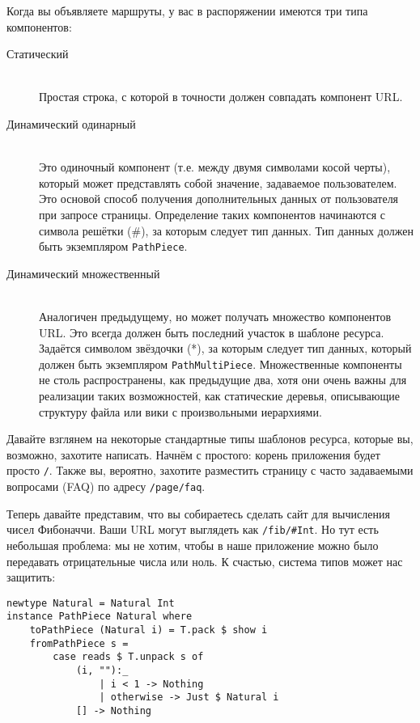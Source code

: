 Когда вы объявляете маршруты, у вас в распоряжении имеются три типа компонентов:
\begin{description}
\item[Статический] \hfill \\
  Простая строка, с которой в точности должен совпадать компонент URL.

\item[Динамический одинарный] \hfill \\
  Это одиночный компонент (т.е. между двумя символами косой черты), который может
  представлять собой значение, задаваемое пользователем. Это основой способ получения
  дополнительных данных от пользователя при запросе страницы. Определение таких
  компонентов начинаются с символа решётки (\#), за которым следует тип данных. Тип данных
  должен быть экземпляром \lstinline!PathPiece!.

\item[Динамический множественный] \hfill \\
  Аналогичен предыдущему, но может получать множество компонентов URL. Это всегда должен
  быть последний участок в шаблоне ресурса. Задаётся символом звёздочки (*), за которым
  следует тип данных, который должен быть экземпляром
  \lstinline!PathMultiPiece!. Множественные компоненты не столь распространены, как
  предыдущие два, хотя они очень важны для реализации таких возможностей, как статические
  деревья, описывающие структуру файла или вики с произвольными иерархиями.
\end{description}

Давайте взглянем на некоторые стандартные типы шаблонов ресурса, которые вы, возможно,
захотите написать. Начнём с простого: корень приложения будет просто \lstinline!/!. Также
вы, вероятно, захотите разместить страницу с часто задаваемыми вопросами (FAQ) по адресу
\lstinline!/page/faq!.

Теперь давайте представим, что вы собираетесь сделать сайт для вычисления чисел
Фибоначчи. Ваши URL могут выглядеть как \lstinline!/fib/#Int!. Но тут есть
небольшая проблема: мы не хотим, чтобы в наше приложение можно было передавать
отрицательные числа или ноль. К счастью, система типов может нас защитить:
\begin{lstlisting}
newtype Natural = Natural Int
instance PathPiece Natural where
    toPathPiece (Natural i) = T.pack $ show i
    fromPathPiece s =
        case reads $ T.unpack s of
            (i, ""):_
                | i < 1 -> Nothing
                | otherwise -> Just $ Natural i
            [] -> Nothing
\end{lstlisting}%

